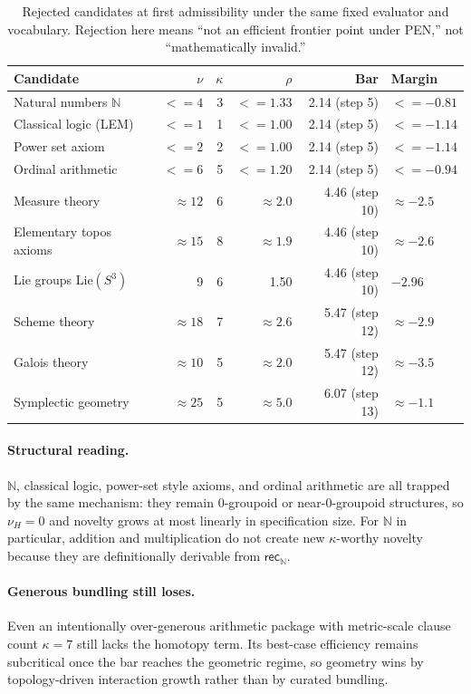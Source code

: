 \documentclass[11pt,a4paper]{article}
\def\leq{<=}%
\theoremstyle{plain}
\theoremstyle{definition}
\theoremstyle{remark}
\newcommand{\N}{\mathbb{N}}
\begin{document}
\begin{table}[tbp]
\centering
\caption{Rejected candidates at first admissibility under the same fixed evaluator and vocabulary. Rejection here means ``not an efficient frontier point under PEN,'' not ``mathematically invalid.''}
\label{tab:rejected}
\small
\begin{tabular}{@{}l rrrrl@{}}
\toprule
Candidate & $\nu$ & $\kappa$ & $\rho$ & Bar & Margin \\
\midrule
Natural numbers $\N$ & $\leq 4$ & 3 & $\leq 1.33$ & 2.14 (step 5) & $\leq -0.81$ \\
Classical logic (LEM) & $\leq 1$ & 1 & $\leq 1.00$ & 2.14 (step 5) & $\leq -1.14$ \\
Power set axiom & $\leq 2$ & 2 & $\leq 1.00$ & 2.14 (step 5) & $\leq -1.14$ \\
Ordinal arithmetic & $\leq 6$ & 5 & $\leq 1.20$ & 2.14 (step 5) & $\leq -0.94$ \\
Measure theory & $\approx 12$ & 6 & $\approx 2.0$ & 4.46 (step 10) & $\approx -2.5$ \\
Elementary topos axioms & $\approx 15$ & 8 & $\approx 1.9$ & 4.46 (step 10) & $\approx -2.6$ \\
Lie groups Lie$(S^3)$ & 9 & 6 & 1.50 & 4.46 (step 10) & $-2.96$ \\
Scheme theory & $\approx 18$ & 7 & $\approx 2.6$ & 5.47 (step 12) & $\approx -2.9$ \\
Galois theory & $\approx 10$ & 5 & $\approx 2.0$ & 5.47 (step 12) & $\approx -3.5$ \\
Symplectic geometry & $\approx 25$ & 5 & $\approx 5.0$ & 6.07 (step 13) & $\approx -1.1$ \\
\bottomrule
\end{tabular}
\end{table}

\paragraph{Structural reading.}
$\N$, classical logic, power-set style axioms, and ordinal arithmetic are all trapped by the same mechanism: they remain 0-groupoid or near-0-groupoid structures, so $\nu_H=0$ and novelty grows at most linearly in specification size. For $\N$ in particular, addition and multiplication do not create new $\kappa$-worthy novelty because they are definitionally derivable from $\mathsf{rec}_\N$.

\paragraph{Generous bundling still loses.}
Even an intentionally over-generous arithmetic package with metric-scale clause count $\kappa=7$ still lacks the homotopy term. Its best-case efficiency remains subcritical once the bar reaches the geometric regime, so geometry wins by topology-driven interaction growth rather than by curated bundling.
\end{document}
